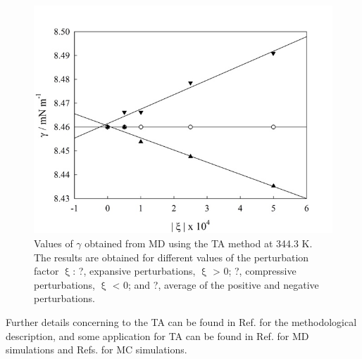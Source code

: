 \documentclass{scrbook}
\begin{document}
\begin{figure}
\includegraphics[width=1\textwidth]{gfx/image66.jpeg}
\caption{Values of {${\gamma}$} obtained from MD using the TA method at 344.3 K. The results are obtained for different values of the perturbation factor ${\upxi}$: ?, expansive perturbations, ${\upxi}$ {\textgreater} 0; ?, compressive perturbations, ${\upxi}$ {\textless} 0; and ?, average of the positive and negative perturbations.}
\label{fig:20}
\end{figure}

Further details concerning to the TA can be found in Ref.
\citep{gloor2005} for the methodological description, and some
application for TA can be found in Ref. \citep{muller2009}
for MD simulations and Refs. \citep{ghoufi2016,sampayo2010} for MC simulations.
\end{document}
